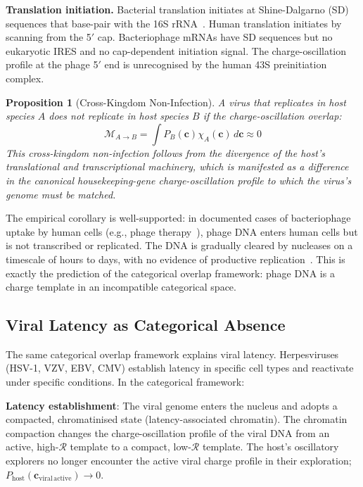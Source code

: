 \documentclass[12pt,a4paper]{article}
\newtheorem{proposition}[theorem]{Proposition}
\theoremstyle{definition}
\theoremstyle{remark}
\newcommand{\Rcat}{\mathcal{R}}
\newcommand{\vv}[1]{\boldsymbol{#1}}
\begin{document}
\textbf{Translation initiation.} Bacterial translation initiates at Shine-Dalgarno (SD) sequences that base-pair with the 16S rRNA~\cite{Shine1975}. Human translation initiates by scanning from the 5$'$ cap. Bacteriophage mRNAs have SD sequences but no eukaryotic IRES and no cap-dependent initiation signal. The charge-oscillation profile at the phage 5$'$ end is unrecognised by the human 43S preinitiation complex.

\begin{proposition}[Cross-Kingdom Non-Infection]
\label{prop:cross_kingdom}
A virus that replicates in host species $A$ does not replicate in host species $B$ if the charge-oscillation overlap:
\begin{equation}
  \mathcal{M}_{A \to B} = \int P_B(\vv{c}) \chi_A(\vv{c})\,d\vv{c} \approx 0
\end{equation}
This cross-kingdom non-infection follows from the divergence of the host's translational and transcriptional machinery, which is manifested as a difference in the canonical housekeeping-gene charge-oscillation profile to which the virus's genome must be matched.
\end{proposition}

The empirical corollary is well-supported: in documented cases of bacteriophage uptake by human cells (e.g., phage therapy~\cite{Schooley2017,Gorski2012}), phage DNA enters human cells but is not transcribed or replicated. The DNA is gradually cleared by nucleases on a timescale of hours to days, with no evidence of productive replication~\cite{Barr2013,Nguyen2017}. This is exactly the prediction of the categorical overlap framework: phage DNA is a charge template in an incompatible categorical space.

\subsection{Viral Latency as Categorical Absence}

The same categorical overlap framework explains viral latency. Herpesviruses (HSV-1, VZV, EBV, CMV) establish latency in specific cell types and reactivate under specific conditions. In the categorical framework:

\textbf{Latency establishment}: The viral genome enters the nucleus and adopts a compacted, chromatinised state (latency-associated chromatin). The chromatin compaction changes the charge-oscillation profile of the viral DNA from an active, high-$\Rcat$ template to a compact, low-$\Rcat$ template. The host's oscillatory explorers no longer encounter the active viral charge profile in their exploration; $P_{\mathrm{host}}(\vv{c}_{\mathrm{viral\,active}}) \rightarrow 0$.
\end{document}
